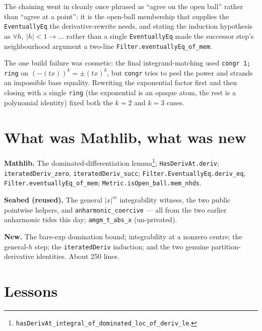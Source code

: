 \documentclass[11pt]{article}
\begin{document}
The chaining went in cleanly once phrased as ``agree on the open ball'' rather
than ``agree at a point'': it is the open-ball membership that supplies the
\texttt{EventuallyEq} the derivative-rewrite needs, and stating the induction
hypothesis as $\forall h,\ |h|<1\to\dots$ rather than a single
\texttt{EventuallyEq} made the successor step's neighbourhood argument a
two-line \texttt{Filter.eventuallyEq\_of\_mem}.

The one build failure was cosmetic: the final integrand-matching used
\texttt{congr 1; ring} on $(-(tx))^k = \pm(tx)^k$, but \texttt{congr} tries to
peel the power and strands an impossible base equality. Rewriting the
exponential factor first and then closing with a single \texttt{ring} (the
exponential is an opaque atom, the rest is a polynomial identity) fixed both
the $k=2$ and $k=3$ cases.

\section{What was Mathlib, what was new}

\textbf{Mathlib.} The dominated-differentiation
lemma\footnote{\texttt{hasDerivAt\_integral\_of\_dominated\_loc\_of\_deriv\_le}.};
\texttt{HasDerivAt.deriv}; \texttt{iteratedDeriv\_zero},
\texttt{iteratedDeriv\_succ}; \texttt{Filter.EventuallyEq.deriv\_eq},
\texttt{Filter.eventuallyEq\_of\_mem}; \texttt{Metric.isOpen\_ball.mem\_nhds}.

\textbf{Seabed (reused).} The general $|x|^m$ integrability witness, the two
public pointwise helpers, and \texttt{anharmonic\_coercive} --- all from the
two earlier anharmonic tides this day; \texttt{amgm\_t\_abs\_x} (un-privated).

\textbf{New.} The bare-exp domination bound; integrability at a nonzero
centre; the general-$h$ step; the \texttt{iteratedDeriv} induction; and the
two genuine partition-derivative identities. About 250 lines.

\section{Lessons}
\end{document}
